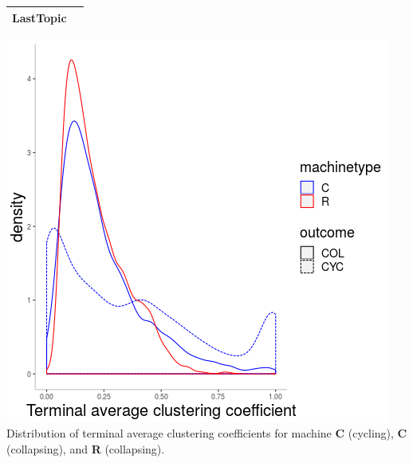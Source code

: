 \documentclass{tufte-handout}
\begin{document}
{\begin{table}
\begin{tabular}{ll}
\vspace{2mm}
LastTopic & \\ \bottomrule
\end{tabular}
\label{tab:TabQ}
\end{table}

\begin{marginfigure}
  \vspace{-8cm}
  \includegraphics{outcomes-acc-dist.png} \\
  \caption{Distribution of terminal average clustering coefficients for machine \textbf{C} (cycling), \textbf{C} (collapsing), and \textbf{R} (collapsing).}\label{fig:OutcomesAccDist}
\end{marginfigure}

}
\end{document}
